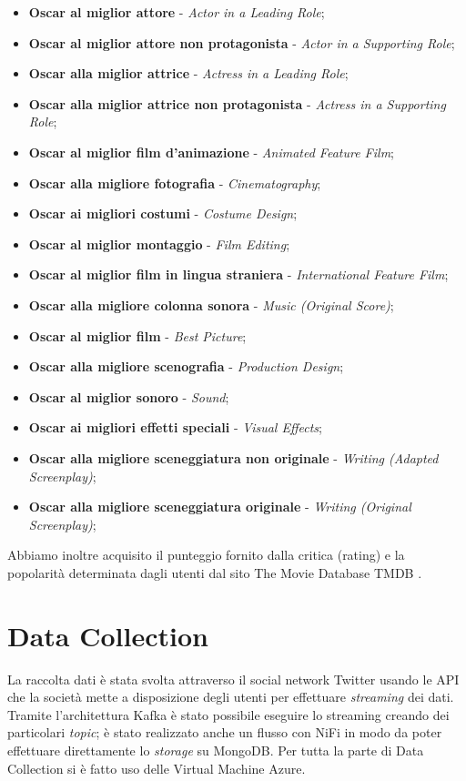 \documentclass[11pt,a4paper]{report}
\begin{document}
\begin{itemize}
    \item \textbf{Oscar al miglior attore} - \textit{Actor in a Leading Role};
    \item \textbf{Oscar al miglior attore non protagonista} - \textit{Actor in a Supporting Role};
    \item \textbf{Oscar alla miglior attrice
} - \textit{Actress in a Leading Role};
    \item \textbf{Oscar alla miglior attrice non protagonista} - \textit{Actress in a Supporting Role};
    \item \textbf{Oscar al miglior film d'animazione} - \textit{Animated Feature Film};
    \item \textbf{Oscar alla migliore fotografia} - \textit{Cinematography};
    \item \textbf{Oscar ai migliori costumi} - \textit{Costume Design};
    \item \textbf{Oscar al miglior montaggio} - \textit{Film Editing};
    \item \textbf{Oscar al miglior film in lingua straniera} - \textit{International Feature Film};
    \item \textbf{Oscar alla migliore colonna sonora} - \textit{Music (Original Score)};
    \item \textbf{Oscar al miglior film} - \textit{Best Picture};
    \item \textbf{Oscar alla migliore scenografia} - \textit{Production Design};
    \item \textbf{Oscar al miglior sonoro} - \textit{Sound};
    \item \textbf{Oscar ai migliori effetti speciali} - \textit{Visual Effects};
    \item \textbf{Oscar alla migliore sceneggiatura non originale} - \textit{Writing (Adapted Screenplay)};
    \item \textbf{Oscar alla migliore sceneggiatura originale} - \textit{Writing (Original Screenplay)};
\end{itemize}

Abbiamo inoltre acquisito il punteggio fornito dalla critica (rating) e la popolarità determinata dagli utenti dal sito The Movie Database TMDB \cite{noauthor_tmdb_nodate}.

\chapter{Data Collection}
La raccolta dati è stata svolta attraverso il social network Twitter usando le API che la società mette a disposizione degli utenti per effettuare \textit{streaming} dei dati. Tramite l'architettura Kafka è stato possibile eseguire lo streaming creando dei particolari \textit{topic}; è stato realizzato anche un flusso con NiFi in modo da poter effettuare direttamente lo \textit{storage} su MongoDB.
Per tutta la parte di Data Collection si è fatto uso delle Virtual Machine Azure.
\end{document}
